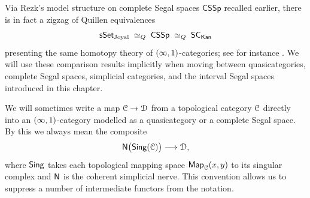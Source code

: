 \begin{remark}
  Via Rezk's model structure on complete Segal spaces 
   $\mathsf{CSSp}$ recalled earlier, there is in fact a zigzag
  of Quillen equivalences
  \[
    \operatorname{\sf sSet}_{\mathrm{Joyal}}
    \;\simeq_Q\;
    \mathsf{CSSp}
    \;\simeq_Q\;
    \mathsf{SC}_{\operatorname{\mathsf{Kan}}}
  \]
  presenting the same homotopy theory of $(\operatorname{\infty},1)$-categories; see for
  instance \cite[Ch.~2]{Ber18}.  We will use these comparison results
  implicitly when moving between quasicategories, complete Segal spaces,
  simplicial categories, and the interval Segal spaces introduced in this
  chapter.
\end{remark}

\begin{remark}
  We will sometimes write a map $\mathcal C \to \mathcal D$ from a topological category
  $\mathcal C$ directly into an $(\operatorname{\infty},1)$-category modelled as a quasicategory or a
  complete Segal space.  By this we always mean the composite
  \[
    \mathsf N\bigl(\operatorname{\mathsf{Sing}}(\mathcal C)\bigr) \longrightarrow \mathcal D,
  \]
  where $\operatorname{\mathsf{Sing}}$ takes each topological mapping space $\operatorname{{\sf Map}}_{\mathcal C}(x,y)$ to its
  singular complex and $\mathsf N$ is the coherent simplicial nerve.  This
  convention allows us to suppress a number of intermediate functors from the
  notation.
\end{remark}


